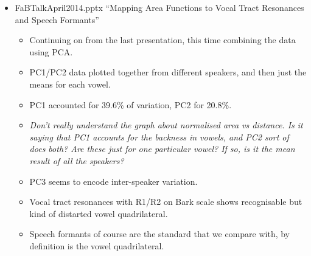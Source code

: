 \documentclass{article}
\begin{document}
\begin{itemize}
\begin{itemize}
        \item FaBTalkApril2014.pptx ``Mapping Area Functions to Vocal Tract Resonances and Speech Formants''
        \begin{itemize}
            \item Continuing on from the last presentation, this time combining the data using PCA.
            \item PC1/PC2 data plotted together from different speakers, and then just the means for each vowel.
            \item PC1 accounted for 39.6\% of variation, PC2 for 20.8\%.
            \item \emph{Don't really understand the graph about normalised area vs distance. Is it saying that PC1 accounts for the backness in vowels, and PC2 sort of does both? Are these just for one particular vowel? If so, is it the mean result of all the speakers?}
            \item PC3 seems to encode inter-speaker variation.
            \item Vocal tract resonances with R1/R2 on Bark scale shows recognisable but kind of distarted vowel quadrilateral.
            \item Speech formants of course are the standard that we compare with, by definition is the vowel quadrilateral.
        \end{itemize}
        

\end{itemize}
\end{itemize}
\end{document}

